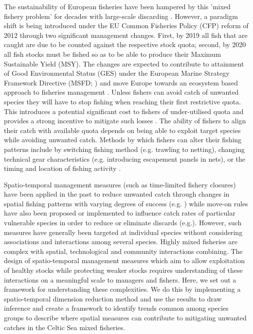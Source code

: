 \documentclass{nature}
\begin{document}
\begin{linenumbers}
The sustainability of European fisheries have been hampered by this 'mixed
fishery problem' for decades with large-scale discarding \cite{Borges2015,
	Uhlmann2014}.  However, a paradigm shift is being introduced under the
EU Common Fisheries Policy (CFP) reform of 2012 through two significant
management changes.  First, by 2019 all fish that are caught are due to be
counted against the respective stock quota; second, by 2020 all fish stocks
must be fished so as to be able to produce their Maximum Sustainable Yield
(MSY)\cite{EuropeanParliamentandCounciloftheEuropeanUnion2013}. The changes are
expected to contribute to attainment of Good Environmental Status (GES) under
the European Marine Strategy Framework Directive (MSFD;
\cite{EuropeanParliament2008}) and move Europe towards an ecosystem based
approach to fisheries management \cite{Garcia2003}. Unless fishers can avoid
catch of unwanted species they will have to stop fishing when reaching their
first restrictive quota. This introduces a potential significant cost to
fishers of under-utilised quota\cite{Hoff2010a, Ulrich2016} and provides a
strong incentive to mitigate such losses \cite{Condie2013, Condie2013a}. The
ability of fishers to align their catch with available quota depends on being
able to exploit target species while avoiding unwanted catch. Methods by which
fishers can alter their fishing patterns include by switching fishing method
(e.g. trawling to netting), changing technical gear characteristics (e.g.
introducing escapement panels in nets), or the timing and location of fishing
activity \cite{Fulton2011b, vanPutten2012a}.

Spatio-temporal management measures (such as time-limited fishery closures)
have been applied in the past to reduce unwanted catch through changes in
spatial fishing patterns with varying degrees of success (e.g.
\cite{Needle2011, Holmes2011, Beare2010, Dinmore2003}) while move-on rules have
also been proposed or implemented to influence catch rates of particular
vulnerable species in order to reduce or eliminate discards
(e.g.\cite{Gardner2008, Dunn2011, Dunn2014a}). However, such measures have
generally been targeted at individual species without considering associations
and interactions among several species. Highly mixed fisheries are complex with
spatial, technological and community interactions combining. The design of
spatio-temporal management measures which aim to allow exploitation of healthy
stocks while protecting weaker stocks requires understanding of these
interactions on a meaningful scale to managers and fishers. Here, we set out a
framework for understanding these complexities. We do this by implementing a
spatio-temporal dimension reduction method and use the results to draw
inference and create a framework to identify trends common among species groups
to describe where spatial measures can contribute to mitigating unwanted
catches in the Celtic Sea mixed fisheries.


\end{linenumbers}
\end{document}
